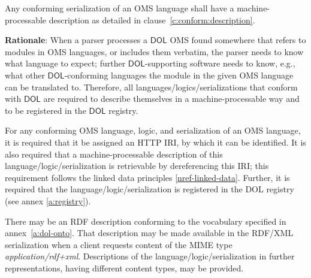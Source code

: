 \documentclass[10pt, a4paper]{isov2}
\makeatletter
\newcommand*{\eg}{e.g.\@\xspace}
\newcommand*\CommentAuthor{}
\renewcommand*\CommentAuthor{#1}}
\newcommand*\CommentDate{}
\renewcommand*\CommentDate{#1}}
\newcommand*\CommentId{}
\renewcommand*\CommentId{#1}}
\newcommand*\CommentType{}
\renewcommand*\CommentType{#1}}
\newcommand*{\SetCommentColorByType}[1]{%
\edef\localType{{#1}}%
\expandafter\ifstrequal\localType{q-aut}{\colorlet{CommentColor}{red}}{%
\expandafter\ifstrequal\localType{q-all}{\colorlet{CommentColor}{orange}}{%
\expandafter\ifstrequal\localType{todo}{\colorlet{CommentColor}{orange}}{%
\expandafter\ifstrequal\localType{fyi}{\colorlet{CommentColor}{lightgray}}{%
\colorlet{CommentColor}{yellow}}}}}}
\newcommand*{\SetCommentPrefixByType}[1]{%
\edef\localType{{#1}}%
\expandafter\@ifmtarg\localType{%
\edef\CommentPrefix{}%
}{%
\caseupper[q]{#1}%
\edef\CommentPrefix{\thestring: }%
}}
\newcommand*{\initComment}[1]{%
\setkeys{Comment}{#1}%
\SetCommentColorByType{\CommentType}%
\relax%
\SetCommentPrefixByType{\CommentType}%
\relax%
}
\newcommand*{\todonote}[2][]{%
\initComment{#1}%
\pdfcomment[author=\CommentAuthor,color=CommentColor,date=\CommentDate,id=\CommentId]{%
\CommentPrefix
#2}}
\renewcommand*{\todonote}[2][]{%
\initComment{#1}%
\ednote{\CommentPrefix #2}}
\newcommand*{\CLnote}[2][author=Christoph Lange]{%
\todonote[author=Christoph Lange,#1]{#2}}
\newcommand*{\mimetype}[1]{\textit{#1}}
\newcommand*{\DOL}{\ensuremath{\mathsf{DOL}}\xspace}
\renewcommand{\annexrefname}{annex}
\renewcommand{\clauserefname}{clause}
\renewcommand{\noterefname}{note}
\renewcommand{\aref}[1]{\annexrefname~\ref{#1}}
\renewcommand{\cref}[1]{\clauserefname~\ref{#1}}
\renewcommand{\nref}[1]{\noterefname~\ref{#1}}
\renewcommand{\nref}[1]{\ref{nref-#1}}
\makeatother
\begin{document}
Any conforming serialization of an OMS language shall have a machine-processable description as detailed in \cref{c:conform:description}.



\label{c:conform:description}

\begin{mdframed}
\textbf{Rationale}: When a parser processes a \DOL OMS found somewhere that refers to modules in OMS languages, or includes them verbatim, the parser needs to know what language to expect; further \DOL-supporting software needs to know, e.g., what other \DOL-conforming languages the module in the given OMS language can be translated to.  Therefore,   all languages/logics/serializations that conform with \DOL are required to describe themselves in a machine-processable way and to be 
registered in the \DOL registry.
\end{mdframed}

For any conforming OMS language, logic, and serialization of an OMS language, it is required that 
it be assigned an HTTP IRI, by which it can be identified.  It is also required that a 
machine-processable description of this language/logic/serialization is retrievable by 
dereferencing this IRI; this requirement follows the linked data principles
\nref{linked-data}. Further, it is required that the language/logic/serialization is registered in the DOL registry (see annex \ref{a:registry}). 


There may be an RDF description conforming to the vocabulary
specified in \aref{a:dol-onto}. That description may be made available in the RDF/XML 
serialization when a client requests content of the MIME type \mimetype{application/rdf+xml}.  
Descriptions of the language/logic/serialization in further representations, having different 
content types, may be provided.%











\end{document}
